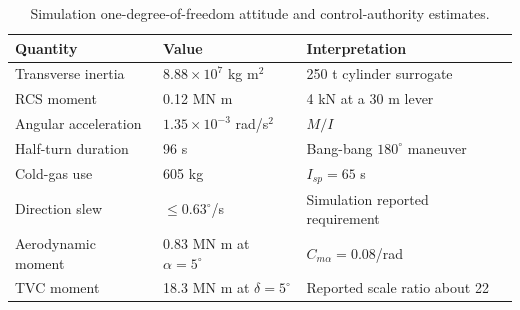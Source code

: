 \begin{table}[htbp]
\caption{Simulation one-degree-of-freedom attitude and control-authority estimates.}
\label{tab:src11}
\small
\setlength{\tabcolsep}{3.5pt}
\begin{tabularx}{\linewidth}{@{}p{.28\linewidth}p{.32\linewidth}X@{}}
\toprule
Quantity & Value & Interpretation \\
\midrule
Transverse inertia & $8.88\times10^7$ kg m$^2$ & 250 t cylinder surrogate \\
RCS moment & 0.12 MN m & 4 kN at a 30 m lever \\
Angular acceleration & $1.35\times10^{-3}$ rad/s$^2$ & $M/I$ \\
Half-turn duration & 96 s & Bang-bang $180^\circ$ maneuver \\
Cold-gas use & 605 kg & $I_{sp}=65$ s \\
Direction slew & $\le0.63^\circ$/s & Simulation reported requirement \\
Aerodynamic moment & 0.83 MN m at $\alpha=5^\circ$ & $C_{m\alpha}=0.08$/rad \\
TVC moment & 18.3 MN m at $\delta=5^\circ$ & Reported scale ratio about 22 \\
\bottomrule
\end{tabularx}
\end{table}
